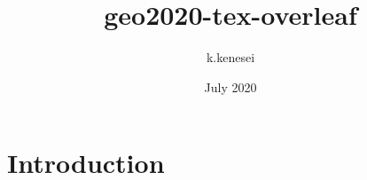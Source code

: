 \documentclass{article}
\title{geo2020-tex-overleaf}
\author{k.kenesei }
\date{July 2020}
\begin{document}
\maketitle

\section{Introduction}
\end{document}
